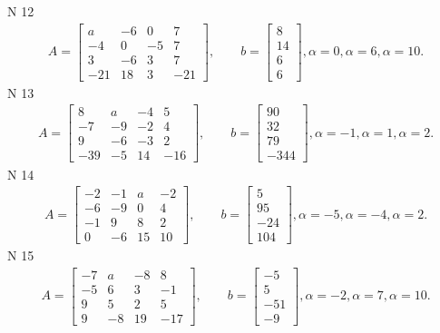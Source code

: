 \documentclass[11pt]{report}
\begin{document}
N 12
\begin{align*}
 A = \left[\begin{matrix}a & -6 & 0 & 7\\-4 & 0 & -5 & 7\\3 & -6 & 3 & 7\\-21 & 18 & 3 & -21\end{matrix}\right],
    \qquad b = \left[\begin{matrix}8\\14\\6\\6\end{matrix}\right], \alpha = 0, \alpha = 6, \alpha = 10. 
 \end{align*}
N 13
\begin{align*}
 A = \left[\begin{matrix}8 & a & -4 & 5\\-7 & -9 & -2 & 4\\9 & -6 & -3 & 2\\-39 & -5 & 14 & -16\end{matrix}\right],
    \qquad b = \left[\begin{matrix}90\\32\\79\\-344\end{matrix}\right], \alpha = -1, \alpha = 1, \alpha = 2. 
 \end{align*}
N 14
\begin{align*}
 A = \left[\begin{matrix}-2 & -1 & a & -2\\-6 & -9 & 0 & 4\\-1 & 9 & 8 & 2\\0 & -6 & 15 & 10\end{matrix}\right],
    \qquad b = \left[\begin{matrix}5\\95\\-24\\104\end{matrix}\right], \alpha = -5, \alpha = -4, \alpha = 2. 
 \end{align*}
N 15
\begin{align*}
 A = \left[\begin{matrix}-7 & a & -8 & 8\\-5 & 6 & 3 & -1\\9 & 5 & 2 & 5\\9 & -8 & 19 & -17\end{matrix}\right],
    \qquad b = \left[\begin{matrix}-5\\5\\-51\\-9\end{matrix}\right], \alpha = -2, \alpha = 7, \alpha = 10. 
 \end{align*}
\end{document}
